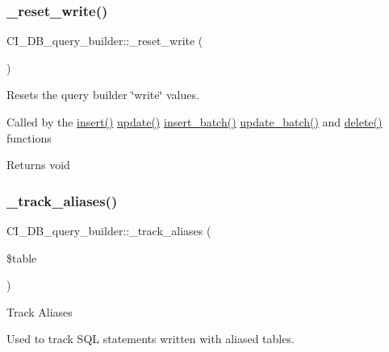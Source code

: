 \subsubsection{\texorpdfstring{\+\_\+reset\+\_\+write()}{\_reset\_write()}}
{\footnotesize\ttfamily C\+I\+\_\+\+D\+B\+\_\+query\+\_\+builder\+::\+\_\+reset\+\_\+write (\begin{DoxyParamCaption}{ }\end{DoxyParamCaption})\hspace{0.3cm}{\ttfamily [protected]}}

Resets the query builder \char`\"{}write\char`\"{} values.

Called by the \mbox{\hyperlink{class_c_i___d_b__query__builder_a499da3fcfbfb23fda9e78c152f4fd3f4}{insert()}} \mbox{\hyperlink{class_c_i___d_b__query__builder_a396216c9f58d8b98ae09faf00f0203f1}{update()}} \mbox{\hyperlink{class_c_i___d_b__query__builder_a71bae775c954d03c320de072bf5e3a65}{insert\+\_\+batch()}} \mbox{\hyperlink{class_c_i___d_b__query__builder_aeb16ba65c9f768f47f5a3f2864a6d293}{update\+\_\+batch()}} and \mbox{\hyperlink{class_c_i___d_b__query__builder_a3e4caf438a69a05c96adedb2cb050d5f}{delete()}} functions

\begin{DoxyReturn}{Returns}
void 
\end{DoxyReturn}
\mbox{\label{class_c_i___d_b__query__builder_a12ff3d6972410ec9b170882f559e6fe9}} 
\subsubsection{\texorpdfstring{\+\_\+track\+\_\+aliases()}{\_track\_aliases()}}
{\footnotesize\ttfamily C\+I\+\_\+\+D\+B\+\_\+query\+\_\+builder\+::\+\_\+track\+\_\+aliases (\begin{DoxyParamCaption}\item[{}]{\$table }\end{DoxyParamCaption})\hspace{0.3cm}{\ttfamily [protected]}}

Track Aliases

Used to track S\+QL statements written with aliased tables.


